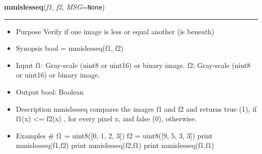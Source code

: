     \label{multireg:num_pymorph:mmislesseq}
    \vspace{0.5ex}

    \begin{boxedminipage}{\textwidth}

    \raggedright \textbf{mmislesseq}(\textit{f1}, \textit{f2}, \textit{MSG}=\texttt{N\-o\-n\-e\-})

    \vspace{-1.5ex}

    \rule{\textwidth}{0.5\fboxrule}
    \begin{itemize}
    \setlength{\parskip}{0.6ex}
      \item Purpose Verify if one image is less or equal another (is beneath)

      \item Synopsis bool = mmislesseq(f1, f2)

      \item Input f1: Gray-scale (uint8 or uint16) or binary image. f2: 
        Gray-scale (uint8 or uint16) or binary image.

      \item Output bool: Boolean

      \item Description mmislesseq compares the images f1 and f2 and returns 
        true (1), if f1(x) {\textless}= f2(x) , for every pixel x, and 
        false (0), otherwise.

      \item Examples \# f1 = uint8([0, 1, 2, 3]) f2 = uint8([9, 5, 3, 3]) 
        print mmislesseq(f1,f2) print mmislesseq(f2,f1) print 
        mmislesseq(f1,f1)

    \end{itemize}

    \vspace{1ex}

    \end{boxedminipage}

    \label{multireg:num_pymorph:mmlabel}
    \vspace{0.5ex}

